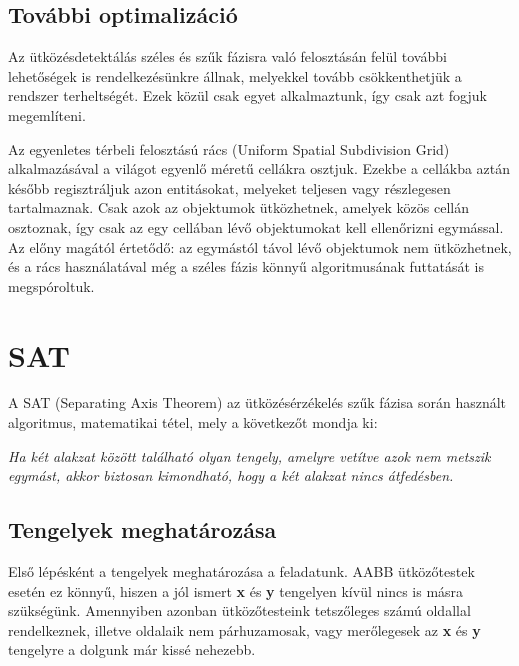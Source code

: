 \documentclass[12pt]{report}
\begin{document}
\fancyfoot{}

\subsection{További optimalizáció}

Az ütközésdetektálás széles és szűk fázisra való felosztásán felül további lehetőségek is rendelkezésünkre állnak, melyekkel tovább csökkenthetjük a rendszer terheltségét. Ezek közül csak egyet alkalmaztunk, így csak azt fogjuk megemlíteni.

Az egyenletes térbeli felosztású rács (Uniform Spatial Subdivision Grid) alkalmazásával a világot egyenlő méretű cellákra osztjuk. Ezekbe a cellákba aztán később regisztráljuk azon entitásokat, melyeket teljesen vagy részlegesen tartalmaznak. Csak azok az objektumok ütközhetnek, amelyek közös cellán osztoznak, így csak az egy cellában lévő objektumokat kell ellenőrizni egymással. Az előny magától értetődő: az egymástól távol lévő objektumok nem ütközhetnek, és a rács használatával még a széles fázis könnyű algoritmusának futtatását is megspóroltuk.

\newpage
\section{SAT}

A SAT (Separating Axis Theorem) az ütközésérzékelés szűk fázisa során használt algoritmus, matematikai tétel, mely a következőt mondja ki:

\begin{center}
    \textit{Ha két alakzat között található olyan tengely, amelyre vetítve azok nem metszik egymást, akkor biztosan kimondható, hogy a két alakzat nincs átfedésben.}
\end{center}

\subsection{Tengelyek meghatározása}

Első lépésként a tengelyek meghatározása a feladatunk. AABB ütközőtestek esetén ez könnyű, hiszen a jól ismert \textbf{x} és \textbf{y} tengelyen kívül nincs is másra szükségünk. Amennyiben azonban ütközőtesteink tetszőleges számú oldallal rendelkeznek, illetve oldalaik nem párhuzamosak, vagy merőlegesek az \textbf{x} és \textbf{y} tengelyre a dolgunk már kissé nehezebb.
\end{document}
